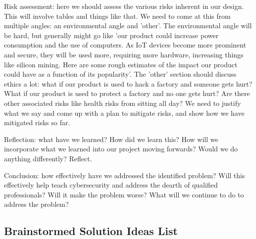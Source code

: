 \documentclass[openright]{report}
\begin{document}
\par Risk assessment: here we should assess the various risks inherent in our design. This will involve tables and things like that. We need to come at this from multiple angles: an environmental angle and 'other'. The environmental angle will be hard, but generally might go like 'our product could increase power consumption and the use of computers. As IoT devices become more prominent and secure, they will be used more, requiring more hardware, increasing things like silicon mining. Here are some rough estimates of the impact our product could have as a function of its popularity'. The 'other' section should discuss ethics a lot: what if our product is used to hack a factory and someone gets hurt? What if our product is used to protect a factory and no one gets hurt? Are there other associated risks like health risks from sitting all day? We need to justify what we say and come up with a plan to mitigate risks, and show how we have mitigated risks so far.


\par Reflection: what have we learned? How did we learn this? How will we incorporate what we learned into our project moving forwards? Would we do anything differently? Reflect.

\pat Conclusion: how effectively have we addressed the identified problem? Will this effectively help teach cybersecurity and address the dearth of qualified professionals? Will it make the problem worse? What will we continue to do to address the problem?




\begin{appendices}
\chapter{Brainstormed Solution Ideas List}


\end{appendices}






\listoffigures
\cleardoublepage
\end{document}
